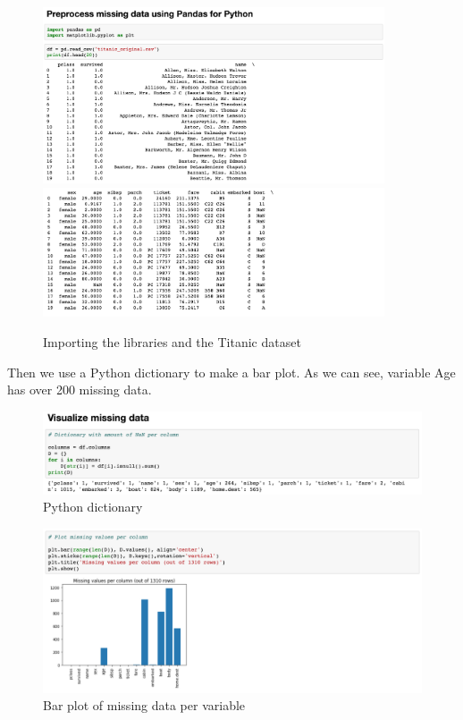 \documentclass[a4paper]{article}
\begin{document}
\begin{figure}[ht!]
\centering
\includegraphics[width=0.9\textwidth]{images/python1.png}
\includegraphics[width=0.9\textwidth]{images/python1b.png}
\caption{Importing the libraries and the Titanic dataset}
\end{figure}

\pagebreak\par\noindent Then we use a Python dictionary to make a bar plot. As we can see, variable Age has over 200 missing data. 

\begin{figure}[ht]
\centering
\includegraphics[width=\textwidth]{images/python2.png}
\caption{Python dictionary}
\end{figure}

\begin{figure}[ht]
\centering
\includegraphics[width=\textwidth]{images/python3.png}
\caption{Bar plot of missing data per variable}
\end{figure}
\end{document}
